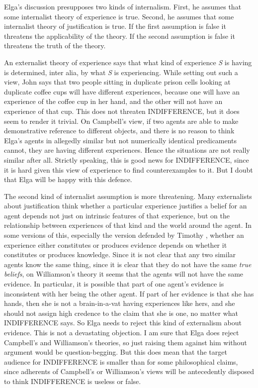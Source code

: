 Elga's discussion presupposes two kinds of internalism. First, he assumes that some internalist theory of experience is true. Second, he assumes that some internalist theory of justification is true. If the first assumption is false it threatens the applicability of the theory. If the second assumption is false it threatens the truth of the theory.

An externalist theory of experience says that what kind of experience \textit{S} is having is determined, inter alia, by what \textit{S} is experiencing. While setting out such a view, John \cite[124-6]{Campbell2002} says that two people sitting in duplicate prison cells looking at duplicate coffee cups will have different experiences, because one will have an experience of the coffee cup in her hand, and the other will not have an experience of that cup. This does not threaten INDIFFERENCE, but it does seem to render it trivial. On Campbell's view, if two agents are able to make demonstrative reference to different objects, and there is no reason to think Elga's agents in allegedly similar but not numerically identical predicaments cannot, they are having different experiences. Hence the situations are not really similar after all. Strictly speaking, this is good news for INDIFFERENCE, since it is hard given this view of experience to find counterexamples to it. But I doubt that Elga will be happy with this defence.

The second kind of internalist assumption is more threatening. Many externalists about justification think whether a particular experience justifies a belief for an agent depends not just on intrinsic features of that experience, but on the relationship between experiences of that kind and the world around the agent. In some versions of this, especially the version defended by Timothy \citet{Williamson1998-WILCOK}, whether an experience either constitutes or produces evidence depends on whether it constitutes or produces knowledge. Since it is not clear that any two similar agents know the same thing, since it is clear that they do not have the same \textit{true} \textit{beliefs}, on Williamson's theory it seems that the agents will not have the same evidence. In particular, it is possible that part of one agent's evidence is inconsistent with her being the other agent. If part of her evidence is that she has hands, then she is not a brain-in-a-vat having experiences like hers, and she should not assign high credence to the claim that she is one, no matter what INDIFFERENCE says. So Elga needs to reject this kind of externalism about evidence. This is not a devastating objection. I am sure that Elga does reject Campbell's and Williamson's theories, so just raising them against him without argument would be question-begging. But this does mean that the target audience for INDIFFERENCE is smaller than for some philosophical claims, since adherents of Campbell's or Williamson's views will be antecedently disposed to think INDIFFERENCE is useless or false.


